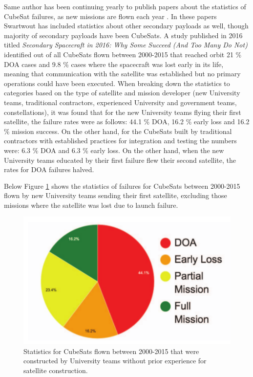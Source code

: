 \documentclass[english,12pt,a4paper,pdftex,elec,utf8]{aaltothesis}
\begin{document}
Same author has been continuing yearly to publish papers about the statistics of CubeSat failures, as new missions are flown each year \cite{Swart2016, Swart2015}. In these papers Swartwout has included statistics about other secondary payloads as well, though majority of secondary payloads have been CubeSats. A study published in 2016 titled \textit{Secondary Spacecraft in 2016:
Why Some Succeed (And Too Many Do Not)} identified out of all CubeSats flown between 2000-2015 that reached orbit 21 \% DOA cases and 9.8 \% cases where the spacecraft was lost early in its life, meaning that communication with the satellite was established but no primary operations could have been executed. When breaking down the statistics to categories based on the type of satellite and mission developer (new University teams, traditional contractors, experienced University and government teams, constellations), it was found that for the new University teams flying their first satellite, the failure rates were as follows: 44.1 \% DOA, 16.2 \% early loss and 16.2 \% mission success. On the other hand, for the CubeSats built by traditional contractors with established practices for integration and testing the numbers were: 6.3 \% DOA and 6.3 \% early loss. On the other hand, when the new University teams educated by their first failure flew their second satellite, the rates for DOA failures halved. \cite{Swart2016, Swart2015}\par 
Below Figure \ref{hobbyistflown2015pic} shows the statistics of failures for CubeSats between 2000-2015 flown by new University teams sending their first satellite, excluding those missions where the satellite was lost due to launch failure.\par 
\begin{figure}[h!]
\centering
\includegraphics[scale=0.5]{hobbyistflown2015}
\caption{Statistics for CubeSats flown between 2000-2015 that were constructed by University teams without prior experience for satellite construction. \cite{Swart2016}}
\label{hobbyistflown2015pic}
\end{figure} 
\end{document}
